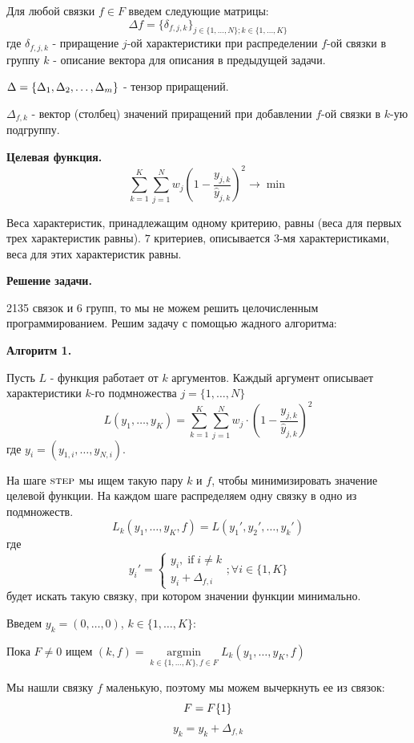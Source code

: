 \documentclass[%
10pt, %
final, %
oneside, %
onecolumn, %
centertags]{article} %
\theoremstyle{plain}
\theoremstyle{definition}
\theoremstyle{remark}
\begin{document}
Для любой связки $f \in F$ введем следующие матрицы:
$$\Delta f =  \{\delta_{f,j,k}\}_{j \in \{1,\ldots, N\};k \in \{1,\ldots,K\}}$$
где $\delta_{f,j,k}$ - приращение $j$-ой характеристики при распределении $f$-ой связки в группу $k$ - описание вектора для описания в предыдущей задачи.

$\Large \Delta = \{\Delta_1,\Delta_2,\ldots,\Delta_m\}$ - тензор приращений.

$\Delta_{f,k}$ - вектор (столбец) значений приращений при добавлении $f$-ой связки в $k$-ую подгруппу.

\textbf{Целевая функция.}
$$\sum\limits_{k=1}^K \sum\limits_{j=1}^N w_j \left(1- \frac{y_{j,k}}{\hat{y}_{j,k}}\right )^2 \to \min$$


Веса характеристик, принадлежащим одному критерию, равны (веса для первых трех характеристик равны). $7$ критериев, описывается $3$-мя характеристиками, веса для этих характеристик равны.

\textbf{Решение задачи.}

2135 связок и 6 групп, то мы не можем решить целочисленным программированием. Решим задачу с помощью жадного алгоритма:


\textbf{Алгоритм 1.}

Пусть $L$ - функция работает от $k$ аргументов. Каждый аргумент описывает характеристики $k$-го подмножества $j = \{1,\ldots,N\}$
$$L(y_1,\ldots,y_K) = \sum\limits_{k=1}^K \sum\limits_{j=1}^N w_j \cdot \left(1-\frac{y_{j,k}}{\hat{y}_{j,k}}\right)^2$$
где $y_i = (y_{1,i},\ldots,y_{N,i})$.

На шаге $\textsc{step}$ мы ищем такую пару $k$ и $f$, чтобы минимизировать значение целевой функции. На каждом шаге распределяем одну связку в одно из подмножеств.
$$L_k(y_1,\ldots,y_K,f) = L(y_1',y_2',\ldots,y_k')$$
где
$$y_i' = \begin{cases}
	y_i, \operatorname{if} i \neq k \\
	y_i + \Delta_{f,i}
\end{cases}; \forall i \in \{1,K\}$$
будет искать такую связку, при котором значении функции минимально.

Введем $y_k = (0,\ldots,0)$, $k \in \{1,\ldots,K\}$:

Пока $F \neq 0$ ищем $(k,f) = \underset{k \in \{1,\ldots,K\}, f \in F}{\operatorname{argmin}} L_k(y_1,\ldots,y_K,f)$

Мы нашли связку $f$ маленькую, поэтому мы можем вычеркнуть ее из связок:
$$F = F \\ \{1\}$$
$$y_k = y_k+ \Delta_{f,k}$$
\end{document}
